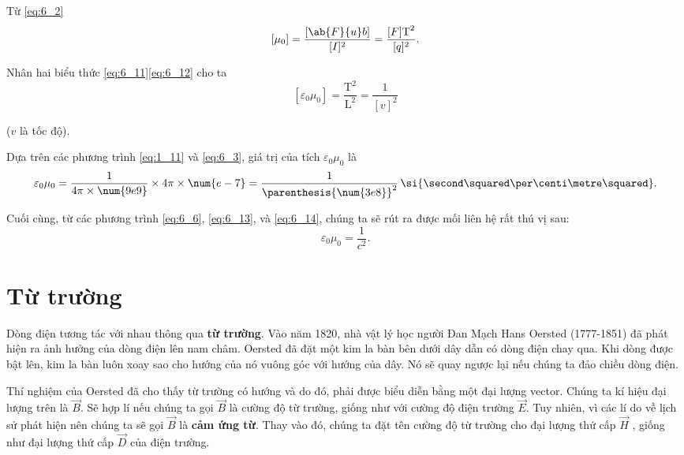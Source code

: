 \noindent
Từ \eqref{eq:6_2}
\begin{equation}\label{eq:6_12}
    [\mu_0] = \frac{[\ab{F}{u} b]}{[I]^2} = \frac{[F] \text{T}^2}{[q]^2}.
\end{equation}

\noindent
Nhân hai biểu thức \eqref{eq:6_11}\eqref{eq:6_12} cho ta
\begin{equation}\label{eq:6_13}
    [\varepsilon_0\mu_0] = \frac{\text{T}^2}{\text{L}^2} = \frac{1}{[v]^2}
\end{equation}

\noindent
($v$ là tốc độ).

Dựa trên các phương trình \eqref{eq:1_11} và \eqref{eq:6_3}, giá trị của tích $\varepsilon_0\mu_0$ là
\begin{equation}\label{eq:6_14}
    \varepsilon_0\mu_0 = \frac{1}{4 \pi \times \num{9e9}} \times 4\pi \times \num{e-7} = \frac{1}{\parenthesis{\num{3e8}}^2}\, \si{\second\squared\per\centi\metre\squared}.
\end{equation}

Cuối cùng, từ các phương trình \eqref{eq:6_6}, \eqref{eq:6_13}, và \eqref{eq:6_14}, chúng ta sẽ rút ra được mối liên hệ rất thú vị sau:
\begin{equation}\label{eq:6_15}
    \varepsilon_0\mu_0 = \frac{1}{c^2}.
\end{equation}

\section{Từ trường}\label{sec:6_2}

Dòng điện tương tác với nhau thông qua \textbf{từ trường}. Vào năm 1820, nhà vật lý học người Đan Mạch Hans Oersted (1777-1851) đã phát hiện ra ảnh hưởng của dòng điện lên nam châm. Oersted đã đặt một kim la bàn bên dưới dây dẫn có dòng điện chay qua. Khi dòng được bật lên, kim la bàn luôn xoay sao cho hướng của nó vuông góc với hướng của dây. Nó sẽ quay ngược lại nếu chúng ta đảo chiều dòng điện.

Thí nghiệm của Oersted đã cho thấy từ trường có hướng và do đó, phải được biểu diễn bằng một đại lượng vector. Chúng ta kí hiệu đại lượng trên là $\vec{B}$. Sẽ hợp lí nếu chúng ta gọi $\vec{B}$ là cường độ từ trường, giống như với cường độ điện trường $\vec{E}$. Tuy nhiên, vì các lí do về lịch sử phát hiện nên chúng ta sẽ gọi $\vec{B}$ là \textbf{cảm ứng từ}. Thay vào đó, chúng ta đặt tên cường độ từ trường cho đại lượng thứ cấp $\vec{H}$ , giống như đại lượng thứ cấp $\vec{D}$ của điện trường.


